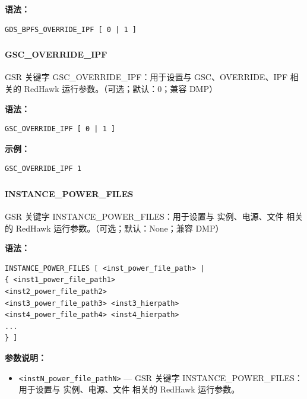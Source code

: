 \textbf{语法：}
\begin{lstlisting}
GDS_BPFS_OVERRIDE_IPF [ 0 | 1 ]
\end{lstlisting}

\subsubsection{}
\paragraph*{GSC_OVERRIDE_IPF}

GSR 关键字 GSC_OVERRIDE_IPF：用于设置与 GSC、OVERRIDE、IPF 相关的 RedHawk 运行参数。（可选；默认：0；兼容 DMP）

\textbf{语法：}
\begin{lstlisting}
GSC_OVERRIDE_IPF [ 0 | 1 ]
\end{lstlisting}

\textbf{示例：}
\begin{lstlisting}
GSC_OVERRIDE_IPF 1
\end{lstlisting}

\subsubsection{}
\paragraph*{INSTANCE_POWER_FILES}

GSR 关键字 INSTANCE_POWER_FILES：用于设置与 实例、电源、文件 相关的 RedHawk 运行参数。（可选；默认：None；兼容 DMP）

\textbf{语法：}
\begin{lstlisting}
INSTANCE_POWER_FILES [ <inst_power_file_path> |
{ <inst1_power_file_path1>
<inst2_power_file_path2>
<inst3_power_file_path3> <inst3_hierpath>
<inst4_power_file_path4> <inst4_hierpath>
...
} ]
\end{lstlisting}

\textbf{参数说明：}
\begin{itemize}
\item \texttt{<instN\_power\_file\_pathN>} — GSR 关键字 INSTANCE\_POWER\_FILES：用于设置与 实例、电源、文件 相关的 RedHawk 运行参数。
\end{itemize}

\subsubsection{}

